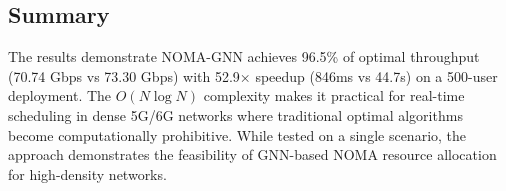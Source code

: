 \subsection{Summary}

The results demonstrate NOMA-GNN achieves 96.5\% of optimal throughput (70.74 Gbps vs 73.30 Gbps) with 52.9× speedup (846ms vs 44.7s) on a 500-user deployment. The $O(N \log N)$ complexity makes it practical for real-time scheduling in dense 5G/6G networks where traditional optimal algorithms become computationally prohibitive. While tested on a single scenario, the approach demonstrates the feasibility of GNN-based NOMA resource allocation for high-density networks.
